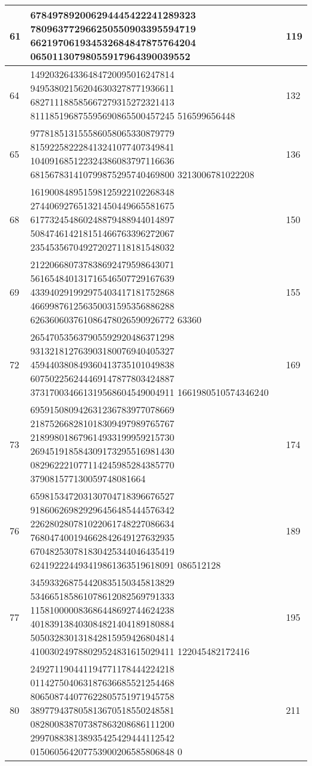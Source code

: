 \documentclass[12pt,conference]{IEEEtran}
\begin{document}
\begin{center}
\begin{tabular}{ |p{1.1cm} | p{5.3cm} | p{1.1cm}|}
\end{tabular}

\begin{tabular}{ |p{1.1cm} | p{5.3cm} | p{1.1cm}|}
  \hline
61 & 678497892006294445422241289323 780963772966250550903395594719 662197061934532684847875764204 06501130798055917964390039552 & 119 \\ \hline 
64 & 149203264336484720095016247814 949538021562046303278771936611 682711188585667279315272321413 811185196875595690865500457245 516599656448 & 132 \\ \hline 
65 & 977818513155586058065330879779 815922582228413241077407349841 104091685122324386083797116636 681567831410799875295740469800 3213006781022208 & 136 \\ \hline 
68 & 161900848951598125922102268348 274406927651321450449665581675 617732454860248879488944014897 508474614218151466763396272067 235453567049272027118181548032  & 150 \\ \hline 
69 & 212206680737838692479598643071 561654840131716546507729167639 433940291992975403417181752868 466998761256350031595356886288 626360603761086478026590926772 63360 & 155 \\ \hline 
72 & 265470535637905592920486371298 931321812763903180076940405327 459440380849360413735101049838 607502256244469147877803424887 373170034661319568604549004911 1661980510574346240 & 169 \\ \hline 
73 & 695915080942631236783977078669 218752668281018309497989765767 218998018679614933199959215730 269451918584309173295516981430 082962221077114245985284385770 379081577130059748081664 & 174 \\ \hline 
76 & 659815347203130704718396676527 918606269829296456485444576342 226280280781022061748227086634 768047400194662842649127632935 670482530781830425344046435419 624192224493419861363519618091 086512128 & 189 \\ \hline 
77 & 345933268754420835150345813829 534665185861078612082569791333 115810000083686448692744624238 401839138403084821404189180884 505032830131842815959426804814 410030249788029524831615029411 122045482172416 & 195 \\ \hline 
80 & 249271190441194771178444224218 011427504063187636685521254468 806508744077622805751971945758 389779437805813670518550248581 082800838707387863208686111200 299708838138935425429444112542 015060564207753900206585806848 0 & 211 \\ \hline 

\end{tabular}


\end{center}
\end{document}
